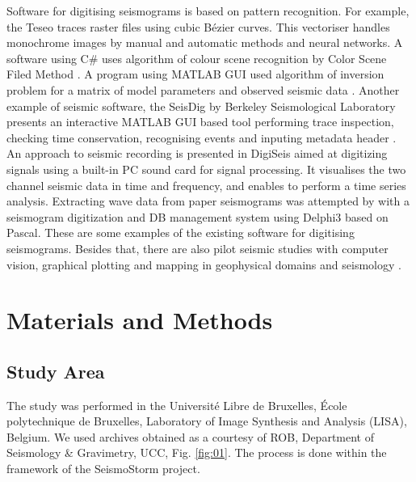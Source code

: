 \documentclass[sensors,article,submit,moreauthors,pdftex]{Definitions/mdpi}
\begin{document}
Software for digitising seismograms is based on pattern recognition. For example, the Teseo \cite{Pintoreetal2005} traces raster files using cubic Bézier curves. This vectoriser handles monochrome images by manual and automatic methods and neural networks. A software using C\# uses algorithm of colour scene recognition by Color Scene Filed Method \cite{Wangetal2016}. A program using MATLAB GUI used algorithm of inversion problem for a matrix of model parameters and observed seismic data \cite{XuXu}. Another example of seismic software, the SeisDig by Berkeley Seismological Laboratory presents an interactive MATLAB GUI based tool performing trace inspection, checking time conservation, recognising events and inputing metadata header \cite{BromirskiChuang2003}. An approach to seismic recording is presented in DigiSeis \cite{Khanetal2012} aimed at digitizing signals using a built-in PC sound card for signal processing. It visualises the two channel seismic data in time and frequency, and enables to perform a time series analysis. Extracting wave data from paper seismograms was attempted by \cite{Liuetal2001} with a seismogram digitization and DB management system using Delphi3 based on Pascal. These are some examples of the existing software for digitising seismograms. Besides that, there are also pilot seismic studies with computer vision, graphical plotting and mapping in geophysical domains and seismology \cite{Lemenkova202017,Lemenkova202032}.

\section{Materials and Methods}

\subsection{Study Area}
The study was performed in the Université Libre de Bruxelles, École polytechnique de Bruxelles, Laboratory of Image Synthesis and Analysis (LISA), Belgium. We used archives obtained as a courtesy of \ac{ROB}, Department of Seismology \& Gravimetry, \ac{UCC}, Fig. \ref{fig:01}. The process is done within the framework of the SeismoStorm project.
\end{document}
